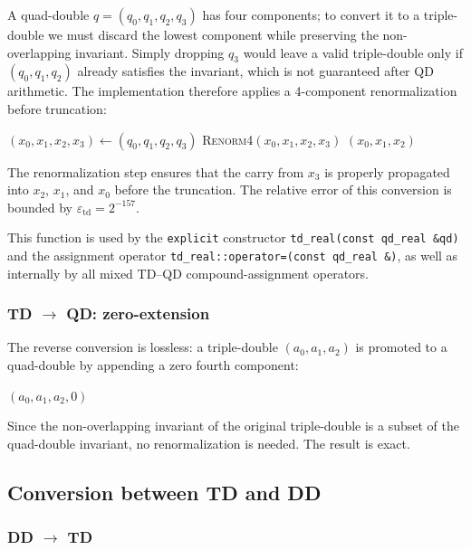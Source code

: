\documentclass[11pt,a4paper]{article}
\begin{document}
A quad-double $q = (q_0, q_1, q_2, q_3)$ has four components; to
convert it to a triple-double we must discard the lowest component
while preserving the non-overlapping invariant.  Simply dropping
$q_3$ would leave a valid triple-double only if $(q_0, q_1, q_2)$
already satisfies the invariant, which is not guaranteed after
QD arithmetic.  The implementation therefore applies a 4-component
renormalization before truncation:
\begin{algorithmic}[1]
  \State $(x_0, x_1, x_2, x_3) \gets (q_0, q_1, q_2, q_3)$
  \State \textsc{Renorm4}$(x_0, x_1, x_2, x_3)$
  \State \Return $(x_0, x_1, x_2)$
\EndFunction
\end{algorithmic}
The renormalization step ensures that the carry from $x_3$ is
properly propagated into $x_2$, $x_1$, and $x_0$ before the
truncation.  The relative error of this conversion is bounded by
$\varepsilon_{\mathrm{td}} = 2^{-157}$.

This function is used by the \texttt{explicit} constructor
\texttt{td\_real(const qd\_real \&qd)} and the assignment operator
\texttt{td\_real::operator=(const qd\_real \&)}, as well as
internally by all mixed TD--QD compound-assignment operators.

\subsubsection{TD $\to$ QD: zero-extension}

The reverse conversion is lossless: a triple-double
$(a_0, a_1, a_2)$ is promoted to a quad-double by appending a
zero fourth component:
\begin{algorithmic}[1]
  \State \Return $(a_0, a_1, a_2, 0)$
\EndFunction
\end{algorithmic}
Since the non-overlapping invariant of the original triple-double
is a subset of the quad-double invariant, no renormalization is
needed.  The result is exact.

\subsection{Conversion between TD and DD}

\subsubsection{DD $\to$ TD}
\end{document}
